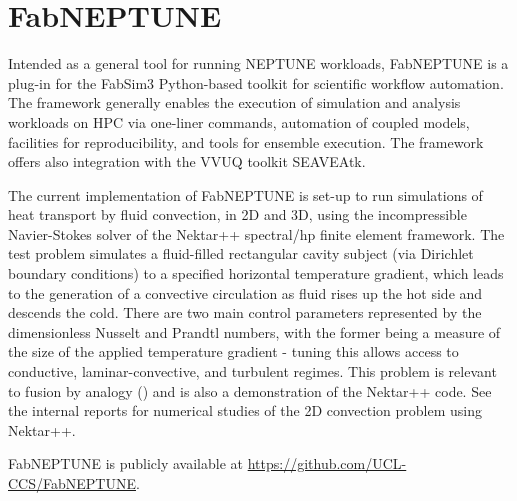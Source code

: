 \section{FabNEPTUNE}

Intended as a general tool for running NEPTUNE workloads, FabNEPTUNE is a plug-in for the FabSim3 Python-based toolkit
 for scientific workflow automation.  The framework generally enables the execution of simulation and analysis workloads
 on HPC via one-liner commands, automation of coupled models, facilities for reproducibility, and tools for ensemble
execution.  The framework offers also integration with the VVUQ toolkit SEAVEAtk. 

The current implementation of FabNEPTUNE is set-up to run simulations of heat transport by fluid convection, in 2D and
 3D, using the incompressible Navier-Stokes solver of the Nektar++ spectral/hp finite element framework.  The test 
problem simulates a fluid-filled rectangular cavity subject (via Dirichlet boundary conditions) to a specified 
horizontal temperature gradient, which leads to the generation of a convective circulation as fluid rises up the hot 
side and descends the cold.  There are two main control parameters represented by the dimensionless Nusselt and 
Prandtl numbers, with the former being a measure of the size of the applied temperature gradient - tuning this 
allows access to conductive, laminar-convective, and turbulent regimes.  This problem is relevant to fusion by 
analogy (\cite{Wi19Stab}) and is also a demonstration of the Nektar++ code.  See the internal reports \cite{y3re61,
y3re62} for numerical studies of the 2D convection problem using Nektar++.

FabNEPTUNE is publicly available at \url{https://github.com/UCL-CCS/FabNEPTUNE}.
